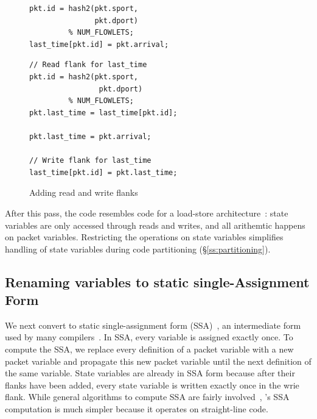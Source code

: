 \begin{figure}[!t]
  \begin{minipage}{0.47\textwidth}
  \begin{small}
  \begin{lstlisting}[style=customc]
pkt.id = hash2(pkt.sport,
               pkt.dport)
         % NUM_FLOWLETS;
last_time[pkt.id] = pkt.arrival;
  \end{lstlisting}
  \end{small}
  \end{minipage}
  \begin{minipage}{0.53\textwidth}
  \begin{small}
  \begin{lstlisting}[style=customc]
// Read flank for last_time
pkt.id = hash2(pkt.sport,
                pkt.dport)
         % NUM_FLOWLETS;
pkt.last_time = last_time[pkt.id];

pkt.last_time = pkt.arrival;

// Write flank for last_time
last_time[pkt.id] = pkt.last_time;
  \end{lstlisting}
  \end{small}
  \end{minipage}
  \caption{Adding read and write flanks}
\label{fig:stateful_flanks}
\end{figure}

After this pass, the code resembles code for a load-store
architecture~\cite{load_store}: state variables are only accessed through reads
and writes, and all arithemtic happens on packet variables. Restricting the
operations on state variables simplifies handling of state variables during
code partitioning (\S\ref{ss:partitioning}).

\subsection{Renaming variables to static single-Assignment Form}
We next convert to static single-assignment form (SSA)~\cite{ssa}, an
intermediate form used by many compilers~\cite{tree_ssa, llvm}.  In SSA, every
variable is assigned exactly once. To compute the SSA, we replace every
definition of a packet variable with a new packet variable and propagate this
new packet variable until the next definition of the same variable. State
variables are already in SSA form because after their flanks have been added,
every state variable is written exactly once in the wrie flank.  While general
algorithms to compute SSA are fairly involved~\cite{ssa}, \pktlanguage's SSA
computation is much simpler because it operates on straight-line code.

